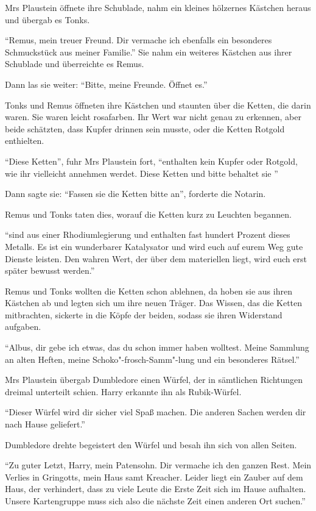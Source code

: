 Mrs Plaustein öffnete ihre Schublade, nahm ein kleines hölzernes Kästchen heraus und übergab es Tonks.

\enquote{Remus, mein treuer Freund. Dir vermache ich ebenfalls ein besonderes Schmuckstück aus meiner Familie.} Sie nahm ein weiteres Kästchen aus ihrer Schublade und überreichte es Remus.

Dann las sie weiter: \enquote{Bitte, meine Freunde. Öffnet es.}

Tonks und Remus öffneten ihre Kästchen und staunten über die Ketten, die darin waren. Sie waren leicht rosafarben. Ihr Wert war nicht genau zu erkennen, aber beide schätzten, dass Kupfer drinnen sein musste, oder die Ketten Rotgold enthielten.

\enquote{Diese Ketten}, fuhr Mrs Plaustein fort, \enquote{enthalten kein Kupfer oder Rotgold, wie ihr vielleicht annehmen werdet. Diese Ketten \gst und bitte behaltet sie \gst}

Dann sagte sie: \enquote{Fassen sie die Ketten bitte an}, forderte die Notarin.

Remus und Tonks taten dies, worauf die Ketten kurz zu Leuchten begannen.

\enquote{\gst sind aus einer Rhodiumlegierung und enthalten fast hundert Prozent dieses Metalls. Es ist ein wunderbarer Katalysator und wird euch auf eurem Weg gute Dienste leisten. Den wahren Wert, der über dem materiellen liegt, wird euch erst später bewusst werden.}

Remus und Tonks wollten die Ketten schon ablehnen, da hoben sie aus ihren Kästchen ab und legten sich um ihre neuen Träger. Das Wissen, das die Ketten mitbrachten, sickerte in die Köpfe der beiden, sodass sie ihren Widerstand aufgaben.

\enquote{Albus, dir gebe ich etwas, das du schon immer haben wolltest. Meine Sammlung an alten Heften, meine Schoko"-frosch-Samm"-lung und ein besonderes Rätsel.}

Mrs Plaustein übergab Dumbledore einen Würfel, der in sämtlichen Richtungen dreimal unterteilt schien. Harry erkannte ihn als Rubik-Würfel.

\enquote{Dieser Würfel wird dir sicher viel Spaß machen. Die anderen Sachen werden dir nach Hause geliefert.}

Dumbledore drehte begeistert den Würfel und besah ihn sich von allen Seiten.

\enquote{Zu guter Letzt, Harry, mein Patensohn. Dir vermache ich den ganzen Rest. Mein Verlies in Gringotts, mein Haus samt Kreacher. Leider liegt ein Zauber auf dem Haus, der verhindert, dass zu viele Leute die Erste Zeit sich im Hause aufhalten. Unsere Kartengruppe muss sich also die nächste Zeit einen anderen Ort suchen.}

